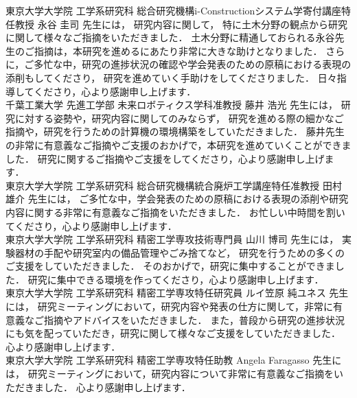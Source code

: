 \newpage

東京大学大学院 工学系研究科 総合研究機構i-Constructionシステム学寄付講座特任教授 永谷 圭司 先生には，
研究内容に関して，
特に土木分野の観点から研究に関して様々なご指摘をいただきました．
土木分野に精通しておられる永谷先生のご指摘は，本研究を進めるにあたり非常に大きな助けとなりました．
さらに，ご多忙な中，研究の進捗状況の確認や学会発表のための原稿における表現の添削もしてくださり，
研究を進めていく手助けをしてくださりました．
日々指導してくださり，心より感謝申し上げます．
\\

千葉工業大学 先進工学部 未来ロボティクス学科准教授 藤井 浩光 先生には，
研究に対する姿勢や，研究内容に関してのみならず，
研究を進める際の細かなご指摘や，研究を行うための計算機の環境構築をしていただきました．
藤井先生の非常に有意義なご指摘やご支援のおかげで，本研究を進めていくことができました．
研究に関するご指摘やご支援をしてくださり，心より感謝申し上げます．
\\

東京大学大学院 工学系研究科 総合研究機構統合廃炉工学講座特任准教授 田村 雄介 先生には，
ご多忙な中，学会発表のための原稿における表現の添削や研究内容に関する非常に有意義なご指摘をいただきました．
お忙しい中時間を割いてくださり，心より感謝申し上げます．
\\

東京大学大学院 工学系研究科 精密工学専攻技術専門員 山川 博司 先生には，
実験器材の手配や研究室内の備品管理やごみ捨てなど，
研究を行うための多くのご支援をしていただきました．
そのおかげで，研究に集中することができました．
研究に集中できる環境を作ってくださり，心より感謝申し上げます．
\\

東京大学大学院 工学系研究科 精密工学専攻特任研究員 ルイ笠原 純ユネス 先生には，
研究ミーティングにおいて，研究内容や発表の仕方に関して，非常に有意義なご指摘やアドバイスをいただきました．
また，普段から研究の進捗状況にも気を配っていただき，研究に関して様々なご支援をしていただきました．
心より感謝申し上げます．
\\

東京大学大学院 工学系研究科 精密工学専攻特任助教 Angela Faragasso 先生には，
研究ミーティングにおいて，研究内容について非常に有意義なご指摘をいただきました．
心より感謝申し上げます．
\\

\newpage

